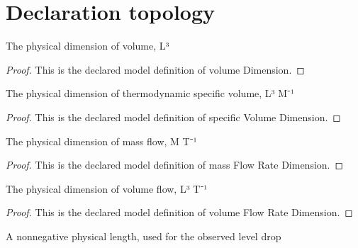 \section{Declaration topology}
\begin{definition}
  \label{def:physics:phyx-mini-0445:phyxminiproblems-problemphyxmini0445-volumedimension}
  The physical dimension of volume, L³
\end{definition}
\begin{proof}
  This is the declared model definition of volume Dimension.
\end{proof}
\begin{definition}
  \label{def:physics:phyx-mini-0445:phyxminiproblems-problemphyxmini0445-specificvolumedimension}
  The physical dimension of thermodynamic specific volume, L³ M⁻¹
\end{definition}
\begin{proof}
  This is the declared model definition of specific Volume Dimension.
\end{proof}
\begin{definition}
  \label{def:physics:phyx-mini-0445:phyxminiproblems-problemphyxmini0445-massflowratedimension}
  The physical dimension of mass flow, M T⁻¹
\end{definition}
\begin{proof}
  This is the declared model definition of mass Flow Rate Dimension.
\end{proof}
\begin{definition}
  \label{def:physics:phyx-mini-0445:phyxminiproblems-problemphyxmini0445-volumeflowratedimension}
  The physical dimension of volume flow, L³ T⁻¹
\end{definition}
\begin{proof}
  This is the declared model definition of volume Flow Rate Dimension.
\end{proof}
\begin{definition}
  \label{def:physics:phyx-mini-0445:phyxminiproblems-problemphyxmini0445-lengthquantity}
  A nonnegative physical length, used for the observed level drop
\end{definition}
